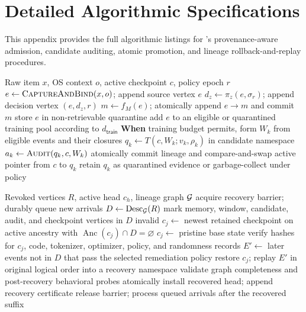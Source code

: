 \section{Detailed Algorithmic Specifications}
\label{app:algorithms}

This appendix provides the full algorithmic listings for \PG{}'s provenance-aware admission, candidate auditing, atomic promotion, and lineage rollback-and-replay procedures.

\begin{algorithm}[t]
\caption{Provenance-Aware Admission and Quarantine}
\label{alg:admission}
\begin{algorithmic}[1]
\Require Raw item $x$, OS context $o$, active checkpoint $c$, policy epoch $r$
\State $e\gets\textsc{CaptureAndBind}(x,o)$; append source vertex $e$
  \State $d_z\gets\pi_z(e,\sigma_r)$; append decision vertex $(e,d_z,r)$
\EndFor
{}
  \State $m\gets f_M(e)$; atomically append $e\rightarrow m$ and commit $m$
  \State store $e$ in non-retrievable quarantine
\EndIf
{}
  \State add $e$ to an eligible or quarantined training pool according to $d_{\mathsf{train}}$
\EndIf
\State \textbf{When} training budget permits, form $W_k$ from eligible events and their closures
\State $q_k\gets T(c,W_k;v_k,\rho_k)$ in candidate namespace
\State $a_k\gets\textsc{Audit}(q_k,c,W_k)$
  \State atomically commit lineage and compare-and-swap active pointer from $c$ to $q_k$
\Else
  \State retain $q_k$ as quarantined evidence or garbage-collect under policy
\EndIf
\end{algorithmic}
\end{algorithm}

\begin{algorithm}[t]
\caption{Lineage Rollback-and-Replay}
\label{alg:rollback}
\begin{algorithmic}[1]
\Require Revoked vertices $R$, active head $c_h$, lineage graph $\mathcal{G}$
\State acquire recovery barrier; durably queue new arrivals
\State $D\gets\operatorname{Desc}_{\mathcal{G}}(R)$
\State mark memory, window, candidate, audit, and checkpoint vertices in $D$ invalid
\State $c_j\gets$ newest retained checkpoint on active ancestry with $\operatorname{Anc}(c_j)\cap D=\varnothing$
  \State $c_j\gets$ pristine base state
\EndIf
\State verify hashes for $c_j$, code, tokenizer, optimizer, policy, and randomness records
\State $E'\gets$ later events not in $D$ that pass the selected remediation policy
\State restore $c_j$; replay $E'$ in original logical order into a recovery namespace
\State validate graph completeness and post-recovery behavioral probes
\State atomically install recovered head; append recovery certificate
\State release barrier; process queued arrivals after the recovered suffix
\end{algorithmic}
\end{algorithm}
